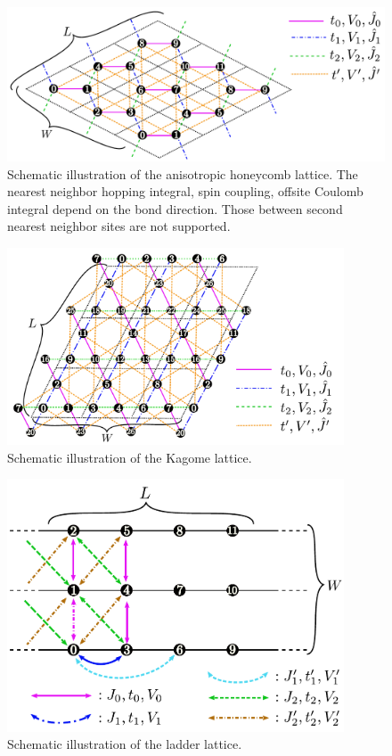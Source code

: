 \begin{itemize}
\begin{figure}[!tbhp]
  \begin{center}
    \includegraphics[width=15cm]{../figs/chap04_1_honeycomb.pdf}
    \caption{Schematic illustration of the anisotropic honeycomb lattice.
      The nearest neighbor 
      hopping integral, spin coupling, offsite Coulomb integral
      depend on the bond direction.
      Those between second nearest neighbor sites are not supported.
    }
    \label{fig_chap04_1_honeycomb}
  \end{center}
\end{figure}

\begin{figure}[!tbhp]
  \begin{center}
    \includegraphics[width=10cm]{../figs/kagome.pdf}
    \caption{Schematic illustration of the Kagome lattice.
    }
    \label{fig_kagome}
  \end{center}
\end{figure}

\begin{figure}[!tbhp]
  \begin{center}
    \includegraphics[width=10cm]{../figs/ladder.pdf}
    \caption{Schematic illustration of the ladder lattice.
    }
    \label{fig_ladder}
  \end{center}
\end{figure}


\end{itemize}
